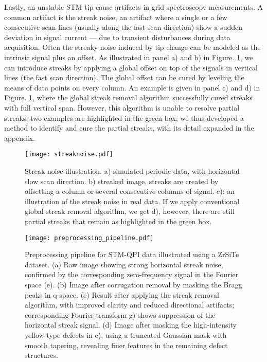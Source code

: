 Lastly, an unstable \ac{STM} tip cause artifacts in grid spectroscopy measurements. A common  artifact is the streak noise, an artifact where a single or a few consecutive scan lines (usually along the fast scan direction) show a sudden deviation in signal current — due to transient disturbances during data acquisition. Often the streaky noise induced by tip change can be modeled as the intrinsic signal plus an offset. As illustrated in panel a) and b) in Figure. \ref{fig:streaks}, we can introduce streaks by applying a global offset on top of the signals in vertical lines (the fast scan direction). The global offset can be cured by leveling the means of data points on every column. An example is given in panel c) and d) in Figure. \ref{fig:streaks}, where the global streak removal algorithm successfully cured streaks with full vertical span. However, this algorithm is unable to resolve partial streaks, two examples are highlighted in the green box; we thus developed a method to identify and cure the partial streaks, with its detail expanded in the appendix.

\begin{figure}
	\texttt{[image: streaknoise.pdf]} 
	\centering
	\caption{Streak noise illustration. a) simulated periodic data, with horizontal slow scan direction. b) streaked image, streaks are created by offsetting a column or several consecutive columns of signal. c): an illustration of the streak noise in real data. If we apply conventional global streak removal algorithm, we get d), however, there are still partial streaks that remain as highlighted in the green box.}
	\label{fig:streaks}
\end{figure}

\begin{figure}
	\texttt{[image: preprocessing\_pipeline.pdf]} 
	\centering
	\caption{Preprocessing pipeline for STM-QPI data illustrated using a ZrSiTe dataset. (a) Raw image showing strong horizontal streak noise, confirmed by the corresponding zero-frequency signal in the Fourier space (e). (b) Image after corrugation removal by masking the Bragg peaks in q-space. (c) Result after applying the streak removal algorithm, with improved clarity and reduced directional artifacts; corresponding Fourier transform g) shows suppression of the horizontal streak signal. (d) Image after masking the high-intensity yellow-type defects in c), using a truncated Gaussian mask with smooth tapering, revealing finer features in the remaining defect structures.}
	\label{fig:pipeline}
\end{figure}

